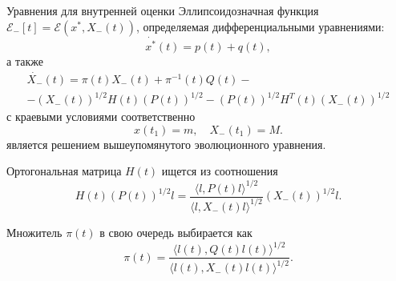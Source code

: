 \documentclass{beamer}
\begin{document}
\begin{frame}{Уравнения для внутренней оценки}
    \footnotesize
    Эллипсоидозначная функция \( \mathcal{E}_-[t] = \mathcal{E}(x^*, X_-(t)) \), определяемая
     дифференциальными уравнениями:
    \begin{equation*}
        \dot{x^*}(t) = p(t) + q(t),
    \end{equation*}
    а также
    \begin{equation*}
        \begin{gathered}
            \dot{X_-}(t) = \pi(t) X_-(t) + \pi^{-1}(t) Q(t) - \\
             - (X_-(t))^{1/2} H(t) (P(t))^{1/2} - (P(t))^{1/2} H^T(t) (X_-(t))^{1/2}
        \end{gathered}
    \end{equation*}
    с краевыми условиями соответственно
    \begin{equation*}
        x(t_1) = m, \quad X_-(t_1) = M.
    \end{equation*}
    является решением вышеупомянутого эволюционного уравнения.
    
    Ортогональная матрица \( H(t) \) ищется из соотношения 
    \begin{equation*}
    H(t)(P(t))^{1/2} l = \frac{\langle l, P(t) l \rangle^{1/2}}{\langle l, X_-(t) l \rangle^{1/2}} (X_-(t))^{1/2} l.
    \end{equation*}
    
    Множитель \( \pi(t) \) в свою очередь выбирается как
    \begin{equation*}
    \pi(t) = \frac{\langle l(t), Q(t) l(t) \rangle^{1/2}}{\langle l(t), X_-(t) l(t) \rangle^{1/2}}.
    \end{equation*}

\end{frame}
\end{document}

